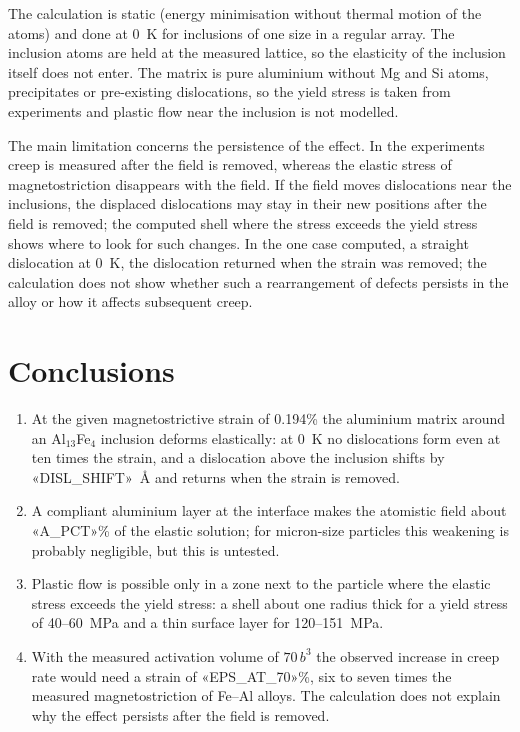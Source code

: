 \documentclass[11pt,a4paper]{article}
\begin{document}
The calculation is static (energy minimisation without thermal motion of
the atoms) and done at 0~K for inclusions of one size in a regular array.
The inclusion atoms are held at the measured lattice, so the elasticity of
the inclusion itself does not enter. The matrix is pure aluminium without Mg
and Si atoms, precipitates or pre-existing dislocations, so the yield stress
is taken from experiments \cite{Friha2024JMMM,Skvortsov2019JAP,Pshonkin2025ZL}
and plastic flow near the inclusion is not modelled.

The main limitation concerns the persistence of the effect. In the experiments creep is
measured after the field is removed, whereas the elastic stress of
magnetostriction disappears with the field. If the field moves dislocations
near the inclusions, the displaced dislocations may stay in their new positions
after the field is removed; the computed shell where the stress exceeds the
yield stress shows where to look for such changes.
In the one case computed, a straight dislocation at 0~K, the dislocation
returned when the strain was removed; the calculation does not show whether
such a rearrangement of defects persists in the alloy or how it affects
subsequent creep.

\section{Conclusions}

\begin{enumerate}
\item At the given magnetostrictive strain of 0.194\% the aluminium matrix
around an Al$_{13}$Fe$_4$ inclusion deforms elastically: at 0~K no
dislocations form even at ten times the strain, and a dislocation above the
inclusion shifts by «DISL_SHIFT»~\AA{} and returns when the strain is
removed.
\item A compliant aluminium layer at the interface makes the atomistic
field about «A_PCT»\% of the elastic solution; for micron-size particles
this weakening is probably negligible, but this is untested.
\item Plastic flow is possible only in a zone next to the particle where
the elastic stress exceeds the yield stress: a shell about one radius thick
for a yield stress of 40--60~MPa and a thin surface layer for
120--151~MPa.
\item With the measured activation volume of $70\,b^3$ the observed
increase in creep rate would need a strain of «EPS_AT_70»\%, six to seven
times the measured magnetostriction of Fe--Al alloys. The calculation does
not explain why the effect persists after the field is removed.
\end{enumerate}
\end{document}
